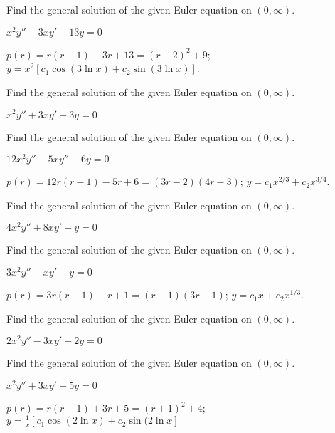 \documentclass{ximera}
\begin{document}
\begin{problem}\label{exer:7.4.6} 
Find the general solution of
the given Euler equation on $(0,\infty)$.

$x^2y''-3xy'+13y=0$

\begin{solution}
    $p(r)=r(r-1)-3r+13=(r-2)^2+9$;
 $y=x^2[c_1 \cos (3 \ln x)+c_2 \sin (3 \ln x)]$.

\end{solution}
\end{problem}


\begin{problem}\label{exer:7.4.7} 
Find the general solution of
the given Euler equation on $(0,\infty)$.

$x^2y''+3xy'-3y=0$
\end{problem}

\begin{problem}\label{exer:7.4.8}
Find the general solution of
the given Euler equation on $(0,\infty)$.

$12x^2y''-5xy''+6y=0$

\begin{solution}
    $p(r)=12r(r-1)-5r+6=(3r-2)(4r-3)$;
$y=c_1x^{2/3}+c_2 x^{3/4}$.
\end{solution}
\end{problem}

\begin{problem}\label{exer:7.4.9} 
Find the general solution of
the given Euler equation on $(0,\infty)$.

$4x^2y''+8xy'+y=0$
\end{problem}

\begin{problem}\label{exer:7.4.10}
Find the general solution of
the given Euler equation on $(0,\infty)$.

$3x^2y''-xy'+y=0$

\begin{solution}
    $p(r)=3r(r-1)-r+1=(r-1)(3r-1)$; $y=c_1x+c_2x^{1/3}$.
\end{solution}
\end{problem}

\begin{problem}\label{exer:7.4.11} 
Find the general solution of
the given Euler equation on $(0,\infty)$.

$2x^2y''-3xy'+2y=0$
\end{problem}

\begin{problem}\label{exer:7.4.12}
Find the general solution of
the given Euler equation on $(0,\infty)$.

$x^2y''+3xy'+5y=0$

\begin{solution}
    $p(r)=r(r-1)+3r+5=(r+1)^2+4$;
$y=\frac
 {1}{ x}\left[c_1\cos(2 \ln x)+c_2\sin(2 \ln x\right]$
\end{solution}
\end{problem}
\end{document}

